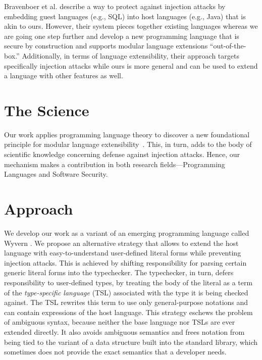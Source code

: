 \documentclass{sig-alternate}
\newcommand{\qs}[1]{}%
\begin{document}
Bravenboer et al. \cite{Bravenboer:2007:PIA:1289971.1289975} describe a way to protect against injection attacks by embedding guest languages (e.g., SQL) into host languages (e.g., Java) that is akin to ours. However, their system pieces together existing languages whereas we are going one step further and develop a new programming language that is secure by construction and supports modular language extensions ``out-of-the-box.'' Additionally, in terms of language extensibility, their approach targets specifically injection attacks while ours is more general and can be used to extend a language with other features as well.

\section{The Science}

Our work applies programming language theory to discover a new foundational principle for modular language extensibility~\cite{tsl14}. This, in turn, adds to the body of scientific knowledge concerning defense against injection attacks. Hence, our mechanism makes a contribution in both research fields---Programming Languages and Software Security.

\section{Approach}
\qs{Describe your approach in attacking the problem and clearly state how your approach is novel.}

We develop our work as a variant of an emerging programming language called Wyvern \cite{Nistor:2013:WST:2489828.2489830}. We propose an alternative strategy that allows to extend the host language with easy-to-understand user-defined literal forms while preventing injection attacks. This is achieved by shifting responsibility for parsing certain generic literal forms into the typechecker. The typechecker, in turn, defers responsibility to user-defined types, by treating the body of the literal as a term of the \emph{type-specific language} (TSL) associated with the type it is being checked against. The TSL rewrites this term to use only general-purpose notations and can contain expressions of the host language. This strategy eschews the problem of ambiguous syntax, because neither the base language nor TSLs are ever extended directly. It also avoids ambiguous semantics and frees notation from being tied to the variant of a  data structure built into the standard library, which sometimes does not provide the exact semantics that a developer needs.
\end{document}
